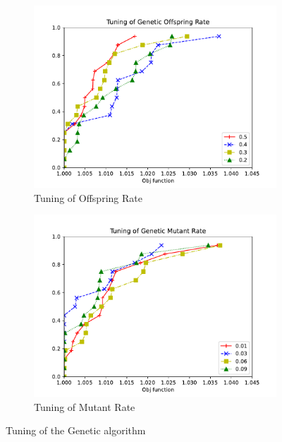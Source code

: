 \begin{figure}[!h]
    \centering
        \begin{subfigure}{0.48\textwidth} %
            \includegraphics[scale=0.45]{images/genoff.pdf} 
            \caption{Tuning of Offspring Rate}
            \label{fig:genoff}
        \end{subfigure}
        \begin{subfigure}{0.48\textwidth}
            \includegraphics[scale=0.45]{images/genmut.pdf}
            \caption{Tuning of Mutant Rate}
            \label{fig:genmut}
        \end{subfigure}
    \caption{Tuning of the Genetic algorithm}
    \end{figure}

